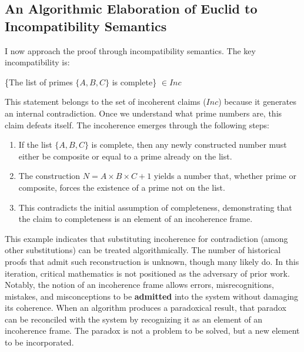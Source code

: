 \documentclass[12pt]{book}
\begin{document}
\subsection{An Algorithmic Elaboration of Euclid to Incompatibility Semantics}

I now approach the proof through incompatibility semantics. The key incompatibility is:

\begin{center}
\{The list of primes $\{A, B, C\}$ is complete\} $\in Inc$
\end{center}

This statement belongs to the set of incoherent claims ($Inc$) because it generates an internal contradiction. Once we understand what prime numbers are, this claim defeats itself. The incoherence emerges through the following steps:

\begin{enumerate}
\item If the list $\{A, B, C\}$ is complete, then any newly constructed number must either be composite or equal to a prime already on the list.
\item The construction $N = A \times B \times C + 1$ yields a number that, whether prime or composite, forces the existence of a prime not on the list.
\item This contradicts the initial assumption of completeness, demonstrating that the claim to completeness is an element of an incoherence frame. 
\end{enumerate}



This example indicates that substituting incoherence for contradiction (among other substitutions) can be treated algorithmically. The number of historical proofs that admit such reconstruction is unknown, though many likely do. In this iteration, critical mathematics is not positioned as the adversary of prior work. Notably, the notion of an incoherence frame allows errors, misrecognitions, mistakes, and misconceptions to be \textbf{admitted} into the system without damaging its coherence.\label{def:admitting_incoherence} When an algorithm produces a paradoxical result, that paradox can be reconciled with the system by recognizing it as an element of an incoherence frame. The paradox is not a problem to be solved, but a new element to be incorporated.
\end{document}
